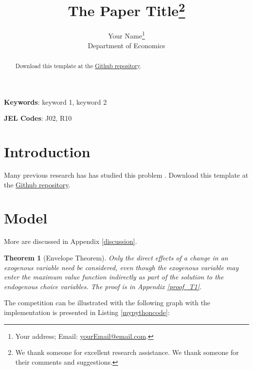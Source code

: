 \documentclass[11pt, letterpaper]{article}
\title{The Paper Title\thanks{We thank someone for excellent research assistance. We thank someone for their comments and suggestions.}}
\author{Your Name\thanks{Your address; Email: \href{mailto:yourEmail@email.com}{yourEmail@email.com}.}\\
Department of Economics}
\date{\the\year{}}
\newtheorem{theorem}{Theorem}
\begin{document}
\maketitle
\vspace*{1cm}

\doublespacing

\begin{abstract}
  \lipsum[3] Download this template at the \href{https://github.com/howardhsumail/Paper-LaTeX-Template.git}{Github repository}.
\end{abstract}
\vspace*{2cm}

\textbf{Keywords}: keyword 1, keyword 2

\textbf{JEL Codes}: J02, R10
\clearpage

\section{Introduction}
\lipsum[4-5] Many previous research has has studied this problem \citep{Lee2018, DS2018}. Download this template at the \href{https://github.com/howardhsumail/Paper-LaTeX-Template.git}{Github repository}.

\section{Model}
\lipsum[105-106] More are discussed in Appendix \ref{discussion}.

\begin{theorem}[Envelope Theorem]
  Only the direct effects of a change in an exogenous variable need be considered, even though the exogenous variable may enter the maximum value function indirectly as part of the solution to the endogenous choice variables. The proof is in Appendix \ref{proof_T1}.
\end{theorem}

The {\color{mycolor}competition} can be illustrated with the following graph with the implementation is presented in Listing \ref{mypythoncode}:
\end{document}
